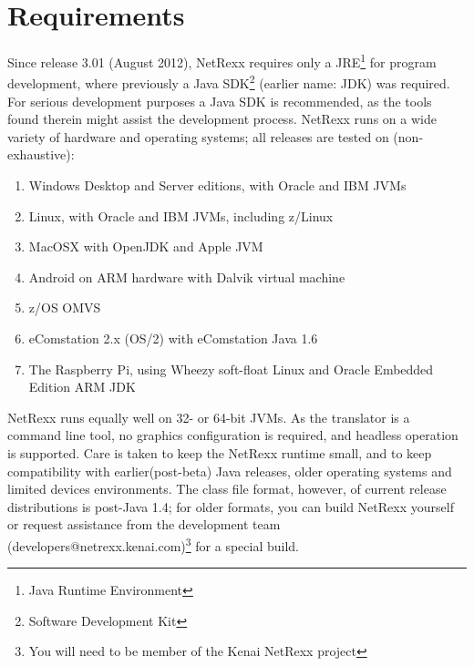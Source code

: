 \chapter{Requirements}
Since release 3.01 (August 2012), NetRexx requires only a
JRE\footnote{Java Runtime Environment} for program development, where previously a
Java SDK\footnote{Software Development Kit} (earlier name: JDK) was required. For serious development
purposes a Java SDK is recommended, as the tools found therein might
assist the development process. NetRexx runs on a wide variety of
hardware and operating systems; all releases are tested on (non-exhaustive):
\begin{enumerate}
\item Windows Desktop and Server editions, with Oracle and IBM JVMs
\item Linux, with Oracle and IBM JVMs, including z/Linux
\item MacOSX with OpenJDK and Apple JVM
\item Android on ARM hardware with Dalvik virtual machine
\item z/OS OMVS
\item eComstation 2.x (OS/2) with eComstation Java 1.6
\item The Raspberry Pi, using Wheezy soft-float Linux and Oracle Embedded
  Edition ARM JDK
\end{enumerate}
NetRexx runs equally well on 32- or 64-bit JVMs. As the translator is
a command line tool, no graphics configuration is required, and
headless operation is supported. Care is taken to keep the NetRexx runtime small, and to keep
compatibility with earlier(post-beta) Java releases, older operating systems and
limited devices environments. The class file format, however, of
current release distributions is post-Java 1.4; for older formats, you
can build NetRexx yourself or request assistance from the development
team (\nolinebreak[4]developers@netrexx.kenai.com)\footnote{You will
  need to be member of the Kenai NetRexx project} for a special build.

